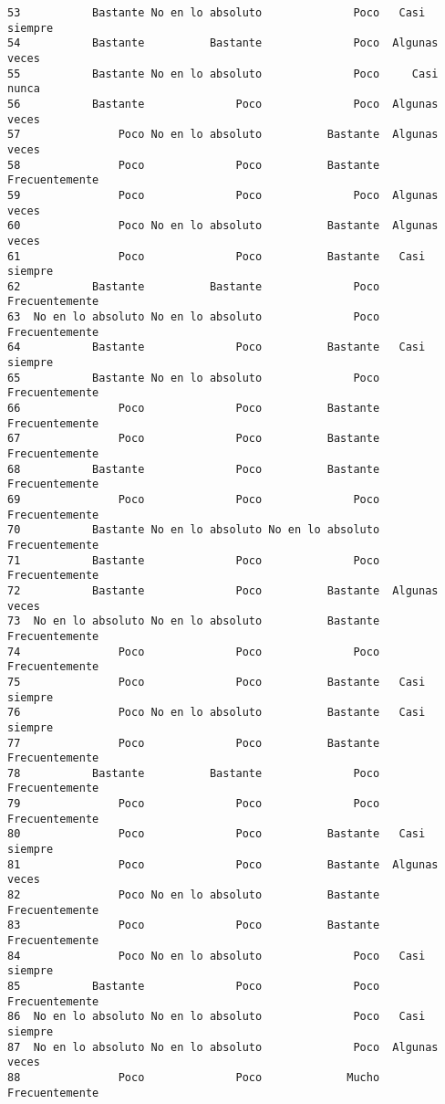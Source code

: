 \documentclass[
  letterpaper,
  DIV=11,
  numbers=noendperiod]{scrartcl}
\begin{document}
\begin{verbatim}
53           Bastante No en lo absoluto              Poco   Casi siempre
54           Bastante          Bastante              Poco  Algunas veces
55           Bastante No en lo absoluto              Poco     Casi nunca
56           Bastante              Poco              Poco  Algunas veces
57               Poco No en lo absoluto          Bastante  Algunas veces
58               Poco              Poco          Bastante Frecuentemente
59               Poco              Poco              Poco  Algunas veces
60               Poco No en lo absoluto          Bastante  Algunas veces
61               Poco              Poco          Bastante   Casi siempre
62           Bastante          Bastante              Poco Frecuentemente
63  No en lo absoluto No en lo absoluto              Poco Frecuentemente
64           Bastante              Poco          Bastante   Casi siempre
65           Bastante No en lo absoluto              Poco Frecuentemente
66               Poco              Poco          Bastante Frecuentemente
67               Poco              Poco          Bastante Frecuentemente
68           Bastante              Poco          Bastante Frecuentemente
69               Poco              Poco              Poco Frecuentemente
70           Bastante No en lo absoluto No en lo absoluto Frecuentemente
71           Bastante              Poco              Poco Frecuentemente
72           Bastante              Poco          Bastante  Algunas veces
73  No en lo absoluto No en lo absoluto          Bastante Frecuentemente
74               Poco              Poco              Poco Frecuentemente
75               Poco              Poco          Bastante   Casi siempre
76               Poco No en lo absoluto          Bastante   Casi siempre
77               Poco              Poco          Bastante Frecuentemente
78           Bastante          Bastante              Poco Frecuentemente
79               Poco              Poco              Poco Frecuentemente
80               Poco              Poco          Bastante   Casi siempre
81               Poco              Poco          Bastante  Algunas veces
82               Poco No en lo absoluto          Bastante Frecuentemente
83               Poco              Poco          Bastante Frecuentemente
84               Poco No en lo absoluto              Poco   Casi siempre
85           Bastante              Poco              Poco Frecuentemente
86  No en lo absoluto No en lo absoluto              Poco   Casi siempre
87  No en lo absoluto No en lo absoluto              Poco  Algunas veces
88               Poco              Poco             Mucho Frecuentemente

\end{verbatim}
\end{document}
